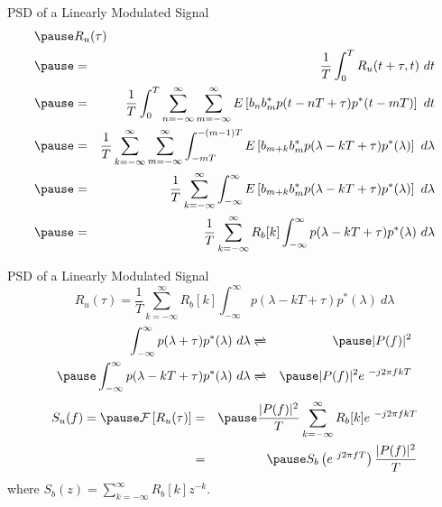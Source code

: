 \documentclass[t]{beamer}
\begin{document}
\begin{frame}{PSD of a Linearly Modulated Signal}
  \footnotesize
  \begin{eqnarray*}
    \pause
    \lefteqn{R_u(\tau)}\\
        \pause
        & = & \frac{1}{T} \int_0^T R_u(t+\tau,t) \ dt \\
        \pause
        & = & \frac{1}{T}\int_0^T \sum_{n=-\infty}^{\infty} \sum_{m=-\infty}^{\infty} E\left[b_nb_m^*p(t-nT+\tau)p^*(t-mT) \right] \ dt\\
        \pause
        & = & \frac{1}{T}\sum_{k=-\infty}^{\infty} \sum_{m=-\infty}^{\infty} \int_{-mT}^{-(m-1)T} E\left[b_{m+k}b_m^*p(\lambda-kT+\tau)p^*(\lambda) \right] \ d\lambda\\
        \pause
        & = & \frac{1}{T}\sum_{k=-\infty}^{\infty} \int_{-\infty}^{\infty} E\left[b_{m+k}b_m^*p(\lambda-kT+\tau)p^*(\lambda) \right] \ d\lambda\\
        \pause
        & = & \frac{1}{T}\sum_{k=-\infty}^{\infty} R_b[k]\int_{-\infty}^{\infty} p(\lambda-kT+\tau)p^*(\lambda)  \ d\lambda
  \end{eqnarray*}
  \normalsize
\end{frame}

\begin{frame}{PSD of a Linearly Modulated Signal}
  \footnotesize
  \begin{equation*}
    R_u(\tau) = \frac{1}{T}\sum_{k=-\infty}^{\infty} R_b[k]\int_{-\infty}^{\infty} p(\lambda-kT+\tau)p^*(\lambda)  \ d\lambda
  \end{equation*}
  \pause
  \begin{eqnarray*}
    \int_{-\infty}^{\infty} p(\lambda+\tau)p^*(\lambda)  \ d\lambda & \xrightleftharpoons{} & \pause \lvert P(f) \rvert^2 \\
    \pause
    \int_{-\infty}^{\infty} p(\lambda-kT+\tau)p^*(\lambda)  \ d\lambda & \xrightleftharpoons{} & \pause \lvert P(f) \rvert^2 e^{\ -j2\pi fkT} 
  \end{eqnarray*}
  \pause
  \begin{eqnarray*}
    S_u(f) = \pause \mathcal{F}\left[ R_u(\tau) \right] & = & \pause \frac{\lvert P(f)\rvert^2}{T}\sum_{k=-\infty}^{\infty} R_b[k] e^{\ -j2\pi fkT} \\
          & = & \pause S_b\left(e^{\ j2\pi fT}\right)\frac{\lvert P(f)\rvert^2}{T}
  \end{eqnarray*}
  where $S_b(z) = \sum_{k=-\infty}^{\infty} R_b[k]z^{-k}$.
  \normalsize
\end{frame}
\end{document}
